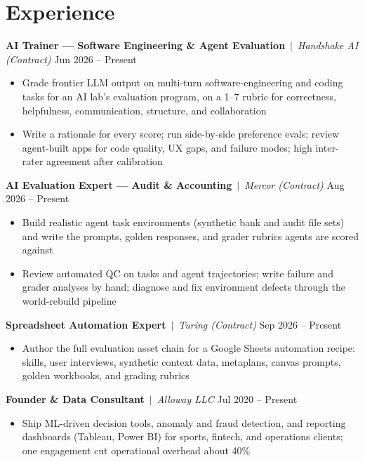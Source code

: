 \documentclass[10pt,letterpaper]{article}
\newcommand{\resumeitem}[1]{\item[\textbullet] #1}
\newcommand{\role}[4]{\textbf{#1} \,$\vert$\, \textit{#2} \hfill #3}
\begin{document}
\section{Experience}

\role{AI Trainer --- Software Engineering \& Agent Evaluation}{Handshake AI (Contract)}{Jun 2026 -- Present}{Remote}
\begin{itemize}[nosep, leftmargin=16pt, topsep=2pt]
    \resumeitem{Grade frontier LLM output on multi-turn software-engineering and coding tasks for an AI lab's evaluation program, on a 1--7 rubric for correctness, helpfulness, communication, structure, and collaboration}
    \resumeitem{Write a rationale for every score; run side-by-side preference evals; review agent-built apps for code quality, UX gaps, and failure modes; high inter-rater agreement after calibration}
\end{itemize}

\vspace{2pt}

\role{AI Evaluation Expert --- Audit \& Accounting}{Mercor (Contract)}{Aug 2026 -- Present}{Remote}
\begin{itemize}[nosep, leftmargin=16pt, topsep=2pt]
    \resumeitem{Build realistic agent task environments (synthetic bank and audit file sets) and write the prompts, golden responses, and grader rubrics agents are scored against}
    \resumeitem{Review automated QC on tasks and agent trajectories; write failure and grader analyses by hand; diagnose and fix environment defects through the world-rebuild pipeline}
\end{itemize}

\vspace{2pt}

\role{Spreadsheet Automation Expert}{Turing (Contract)}{Sep 2026 -- Present}{Remote}
\begin{itemize}[nosep, leftmargin=16pt, topsep=2pt]
    \resumeitem{Author the full evaluation asset chain for a Google Sheets automation recipe: skills, user interviews, synthetic context data, metaplans, canvas prompts, golden workbooks, and grading rubrics}
\end{itemize}

\vspace{2pt}

\role{Founder \& Data Consultant}{Alloway LLC}{Jul 2020 -- Present}{Remote}
\begin{itemize}[nosep, leftmargin=16pt, topsep=2pt]
    \resumeitem{Ship ML-driven decision tools, anomaly and fraud detection, and reporting dashboards (Tableau, Power BI) for sports, fintech, and operations clients; one engagement cut operational overhead about 40\%}
\end{itemize}
\end{document}
